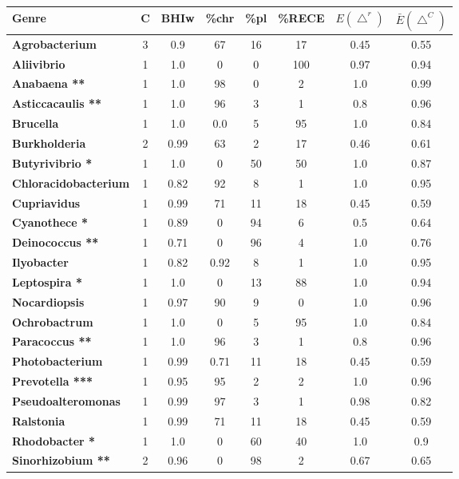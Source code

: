 \begin{landscape}
\thispagestyle{empty}
\begin{small}
		\begin{table}[h]
		\vspace{-1.5cm}
		 \hspace{-2cm}
	  \begin{minipage}[t]{0.45\linewidth}
	  \begin{tabular}{>{\bfseries}l|c|c|ccc|c|c}
	\textbf{Genre}&\textbf{C}&\textbf{\footnotesize BHIw}& \textbf{\footnotesize\%chr}&\textbf{\footnotesize\%pl}&\textbf{\scriptsize\%RECE}&$E(\bigtriangleup^{r}) $&$\bar{E}(\bigtriangleup^{C})$\\
	\hline
 Agrobacterium&3&0.9&67&16&17&0.45&0.55\\
Aliivibrio&1&1.0&0&0&100&0.97&0.94\\
\rowcolor{Cchr}Anabaena **&1&1.0&98&0&2&1.0&0.99\\
\rowcolor{Cchr}Asticcacaulis **&1&1.0&96&3&1&0.8&0.96\\
Brucella&1&1.0&0.0&5&95&1.0&0.84\\
Burkholderia&2&0.99&63&2&17&0.46&0.61\\
\rowcolor{Cpl}Butyrivibrio *&1&1.0&0&50&50&1.0&0.87\\
Chloracidobacterium&1&0.82&92&8&1&1.0&0.95\\
Cupriavidus&1&0.99&71&11&18&0.45&0.59\\
\rowcolor{Cpl}Cyanothece *&1&0.89&0&94&6&0.5&0.64\\
\rowcolor{Cpl}Deinococcus **&1&0.71&0&96&4&1.0&0.76\\
Ilyobacter&1&0.82&0.92&8&1&1.0&0.95\\
\rowcolor{Cpl}Leptospira *&1&1.0&0&13&88&1.0&0.94\\
Nocardiopsis&1&0.97&90&9&0&1.0&0.96\\
Ochrobactrum&1&1.0&0&5&95&1.0&0.84\\
\rowcolor{Cchr}Paracoccus **&1&1.0&96&3&1&0.8&0.96\\
Photobacterium&1&0.99&0.71&11&18&0.45&0.59\\
\rowcolor{Cchr}Prevotella ***&1&0.95&95&2&2&1.0&0.96\\
Pseudoalteromonas&1&0.99&97&3&1&0.98&0.82\\
Ralstonia&1&0.99&71&11&18&0.45&0.59\\
\rowcolor{Cpl}Rhodobacter *&1&1.0&0&60&40&1.0&0.9\\
\rowcolor{Cpl}Sinorhizobium **&2&0.96&0&98&2&0.67&0.65\\

\end{tabular}
\end{minipage}
\end{table}
\end{small}
\end{landscape}

